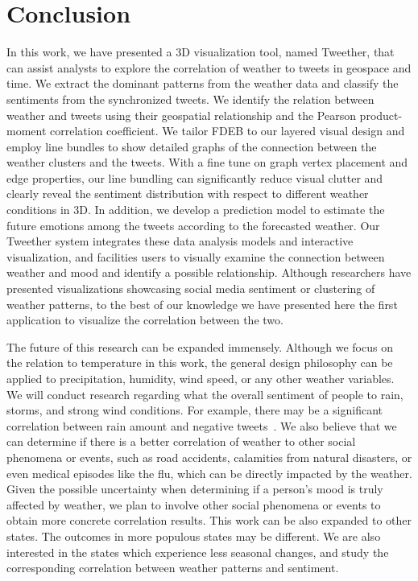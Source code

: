 \chapter{Conclusion}

In this work, we have presented a 3D visualization tool, named Tweether, that can assist analysts to explore the correlation of weather to tweets in geospace and time. We extract the dominant patterns from the weather data and classify the sentiments from the synchronized tweets. We identify the relation between weather and tweets using their geospatial relationship and the Pearson product-moment correlation coefficient. We tailor FDEB to our layered visual design and employ line bundles to show detailed graphs of the connection between the weather clusters and the tweets. With a fine tune on graph vertex placement and edge properties, our line bundling can significantly reduce visual clutter and clearly reveal the sentiment distribution with respect to different weather conditions in 3D. In addition, we develop a prediction model to estimate the future emotions among the tweets according to the forecasted weather. Our Tweether system integrates these data analysis models and interactive visualization, and facilities users to visually examine the connection between weather and mood and identify a possible relationship.
%
Although researchers have presented visualizations showcasing social media sentiment or clustering of weather patterns, to the best of our knowledge we have presented here the first application to visualize the correlation between the two.


The future of this research can be expanded immensely. Although we focus on the relation to temperature in this work, the general design philosophy can be applied to precipitation, humidity, wind speed, or any other weather variables.
We will conduct research regarding what the overall sentiment of people to rain, storms, and strong wind conditions. For example, there may be a significant correlation between rain amount and negative tweets~\cite{hannak2012tweetin}. We also believe that we can determine if there is a better correlation of weather to other social phenomena or events, such as road accidents, calamities from natural disasters, or even medical episodes like the flu, which can be directly impacted by the weather. Given the possible uncertainty when determining if a person's mood is truly affected by weather, we plan to involve other social phenomena or events to obtain more concrete correlation results.
%
This work can be also expanded to other states. The outcomes in more populous states may be different. We are also interested in the states which experience less seasonal changes, and study the corresponding correlation between weather patterns and sentiment.

